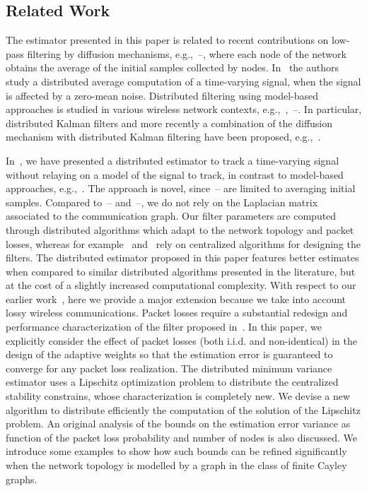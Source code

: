 \documentclass[a4paper,notitlepage,onecolumn]{article}
\numberwithin{equation}{section}
\begin{document}
\subsection{Related Work}

The estimator presented in this paper is related to recent
contributions on low-pass filtering by diffusion mechanisms,
e.g.,~\cite{paperCDC06}--\nocite{paperICC07,Morse03-1,OM04,ConsensusAlberto,XiaoBoydLall,SOSM-CDC05}\cite{Olfati05},
where each node of the network obtains the average of the initial
samples collected by nodes. In~\cite{XiaoBoydKim,XiaoBoyd} the
authors study a distributed average computation of a time-varying
signal, when the signal is affected by a zero-mean noise.
Distributed filtering using model-based approaches is studied in
various wireless network contexts,
e.g.,~\cite{SOSM-CDC05},~\cite{shang}--\nocite{GK-CDC06,OlfatiCDC07}\cite{Alriksson+07}.
In particular, distributed Kalman filters and more recently a
combination of the diffusion mechanism with distributed Kalman
filtering have been proposed, e.g.,~\cite{CarliChiuso+}.

In~\cite{JSAC07}, we have presented a distributed estimator to
track a time-varying signal without relaying on a model of the
signal to track, in contrast to model-based approaches,
e.g.,~\cite{SOSM-CDC05, GK-CDC06}. The approach is novel,
since~\cite{OM04}--\nocite{ConsensusAlberto}\cite{XiaoBoydLall}
are limited to averaging initial samples. Compared
to~\cite{XiaoBoydLall}--\cite{XiaoBoyd}
and~\cite{OlfatiCDC07}--\cite{CarliChiuso+}, we do not rely on the
Laplacian matrix associated to the communication graph. Our filter
parameters are computed through distributed algorithms which adapt
to the network topology and packet losses, whereas for
example~\cite{XiaoBoydKim} and~\cite{XiaoBoyd} rely on centralized
algorithms for designing the filters. The distributed estimator
proposed in this paper features better estimates when compared to
similar distributed algorithms presented in the literature, but at
the cost of a slightly increased computational complexity. With
respect to our earlier work~\cite{JSAC07}, here we provide a major
extension because we take into account lossy wireless
communications. Packet losses require a substantial redesign and
performance characterization of the filter proposed
in~\cite{JSAC07}. In this paper, we explicitly consider the effect
of packet losses (both i.i.d. and non-identical) in the design of
the adaptive weights so that the estimation error is guaranteed to
converge for any packet loss realization. The distributed minimum
variance estimator uses a Lipschitz optimization problem to
distribute the centralized stability constrains, whose
characterization is completely new. We devise a new algorithm to
distribute efficiently the computation of the solution of the
Lipschitz problem. An original analysis of the bounds on the
estimation error variance as function of the packet loss
probability and number of nodes is also discussed. We introduce
some examples to show how such bounds can be refined significantly
when the network topology is modelled by a graph in the class of
finite Cayley graphs.
\end{document}
